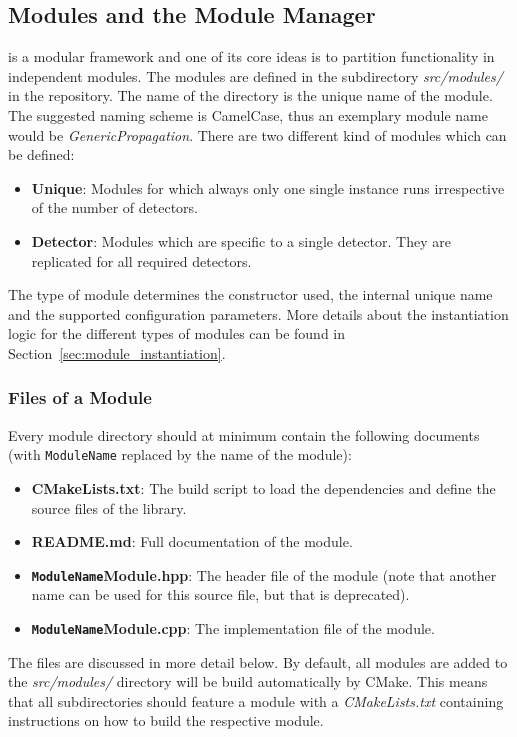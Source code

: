 \subsection{Modules and the Module Manager}
\label{sec:module_manager}
\apsq is a modular framework and one of its core ideas is to partition functionality in independent modules.
The modules are defined in the subdirectory \textit{src/modules/} in the repository.
The name of the directory is the unique name of the module.
The suggested naming scheme is CamelCase, thus an exemplary module name would be \textit{GenericPropagation}.
There are two different kind of modules which can be defined:
\begin{itemize}
\item \textbf{Unique}: Modules for which always only one single instance runs irrespective of the number of detectors.
\item \textbf{Detector}: Modules which are specific to a single detector.
They are replicated for all required detectors.
\end{itemize}
The type of module determines the constructor used, the internal unique name and the supported configuration parameters.
More details about the instantiation logic for the different types of modules can be found in Section~\ref{sec:module_instantiation}.

\subsubsection{Files of a Module}
\label{sec:module_files}
Every module directory should at minimum contain the following documents (with \texttt{ModuleName} replaced by the name of the module):
\begin{itemize}
\item \textbf{CMakeLists.txt}: The build script to load the dependencies and define the source files of the library.
\item \textbf{README.md}: Full documentation of the module.
\item \textbf{\texttt{ModuleName}Module.hpp}: The header file of the module (note that another name can be used for this source file, but that is deprecated).
\item \textbf{\texttt{ModuleName}Module.cpp}: The implementation file of the module.
\end{itemize}
The files are discussed in more detail below.
By default, all modules are added to the \textit{src/modules/} directory will be build automatically by CMake.
This means that all subdirectories should feature a module with a \textit{CMakeLists.txt} containing instructions on how to build the respective module.

